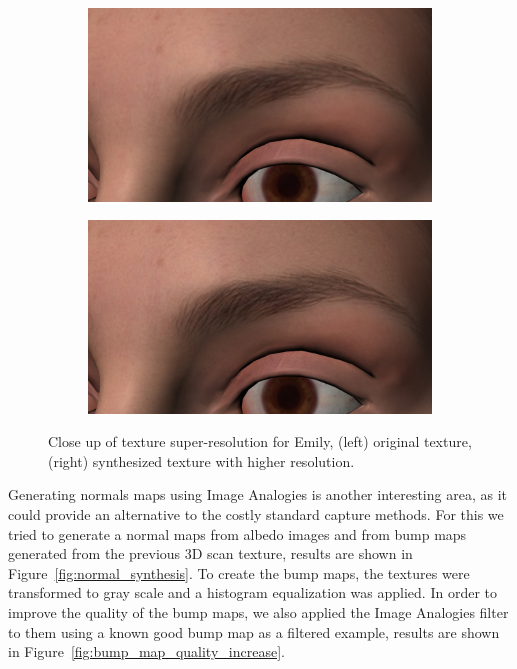 \begin{figure}
        \centering
        \begin{subfigure}[b]{0.48\textwidth}
                \includegraphics[width=\textwidth]{img/emily_close_original}
        \end{subfigure}
        \begin{subfigure}[b]{0.48\textwidth}
                \includegraphics[width=\textwidth]{img/emily_close_sr}
        \end{subfigure}
        \caption{Close up of texture super-resolution for Emily, (left) original texture, (right) synthesized texture with higher resolution.}
\end{figure}

Generating normals maps using Image Analogies is another interesting area, as it could provide an alternative to the costly standard capture methods.
For this we tried to generate a normal maps from albedo images and from bump maps generated from the previous 3D scan texture, results are shown in Figure~\ref{fig:normal_synthesis}. 
To create the bump maps, the textures were transformed to gray scale and a histogram equalization was applied.
In order to improve the quality of the bump maps, we also applied the Image Analogies filter to them using a known good bump map as a filtered example, results are shown in Figure~\ref{fig:bump_map_quality_increase}.

